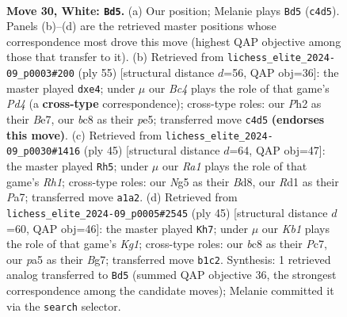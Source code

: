 \documentclass[11pt]{article}
\begin{document}
\clearpage

\begin{figure}[p]\centering
\begin{subfigure}{0.46\textwidth}\centering
\resizebox{\linewidth}{!}{%
\newchessgame
\chessboard[
  setfen={2b4r/r5k1/pnn1P1p1/p4pNp/2B2B2/P4PP1/1P5P/RK1R4 w - - 1 30},
  showmover=false,
  pgfstyle=straightmove, color=movearrow, markmove={c4-d5}
]}
\caption{}
\end{subfigure}\hfill
\begin{subfigure}{0.46\textwidth}\centering
\resizebox{\linewidth}{!}{%
\newchessgame
\chessboard[
  setfen={2r1k2r/4bp2/p5p1/2ppP1n1/Pp2P3/5PPp/1P2N2P/R1B2RK1 b k - 0 28},
  showmover=false,
  pgfstyle=straightmove, color=movearrow, markmove={d5-e4}
]}
\caption{}
\end{subfigure}
\\[4pt]
\begin{subfigure}{0.46\textwidth}\centering
\resizebox{\linewidth}{!}{%
\newchessgame
\chessboard[
  setfen={3bk2r/p1p2pp1/1p6/1bp1PP2/7p/3NB2P/PPP2RP1/6K1 b - - 1 23},
  showmover=false,
  pgfstyle=straightmove, color=movearrow, markmove={h8-h5}
]}
\caption{}
\end{subfigure}\hfill
\begin{subfigure}{0.46\textwidth}\centering
\resizebox{\linewidth}{!}{%
\newchessgame
\chessboard[
  setfen={3rr1k1/p1p3b1/1p4pp/4p3/P1n1N2P/2P1B1P1/2b2PB1/R3R1K1 b - - 4 23},
  showmover=false,
  pgfstyle=straightmove, color=movearrow, markmove={g8-h7}
]}
\caption{}
\end{subfigure}
\caption{\textbf{Move 30, White: \texttt{Bd5}.} (a) Our position; Melanie plays \texttt{Bd5} (\texttt{c4d5}). Panels (b)--(d) are the retrieved master positions whose correspondence most drove this move (highest QAP objective among those that transfer to it). (b) Retrieved from \texttt{lichess\_elite\_2024-09\_p0003\#200} (ply 55) [structural distance $d$=56, QAP obj=36]: the master played \texttt{dxe4}; under $\mu$ our \emph{Bc4} plays the role of that game's \emph{Pd4} (a \textbf{cross-type} correspondence); cross-type roles: our \emph{P}h2 as their \emph{B}e7, our \emph{b}c8 as their \emph{p}e5; transferred move \texttt{c4d5} \textbf{(endorses this move)}. (c) Retrieved from \texttt{lichess\_elite\_2024-09\_p0030\#1416} (ply 45) [structural distance $d$=64, QAP obj=47]: the master played \texttt{Rh5}; under $\mu$ our \emph{Ra1} plays the role of that game's \emph{Rh1}; cross-type roles: our \emph{N}g5 as their \emph{B}d8, our \emph{R}d1 as their \emph{P}a7; transferred move \texttt{a1a2}. (d) Retrieved from \texttt{lichess\_elite\_2024-09\_p0005\#2545} (ply 45) [structural distance $d$=60, QAP obj=46]: the master played \texttt{Kh7}; under $\mu$ our \emph{Kb1} plays the role of that game's \emph{Kg1}; cross-type roles: our \emph{b}c8 as their \emph{P}c7, our \emph{p}a5 as their \emph{B}g7; transferred move \texttt{b1c2}. Synthesis: 1 retrieved analog transferred to \texttt{Bd5} (summed QAP objective 36, the strongest correspondence among the candidate moves); Melanie committed it via the \texttt{search} selector.}
\label{fig:thought-m58}
\end{figure}
\end{document}
